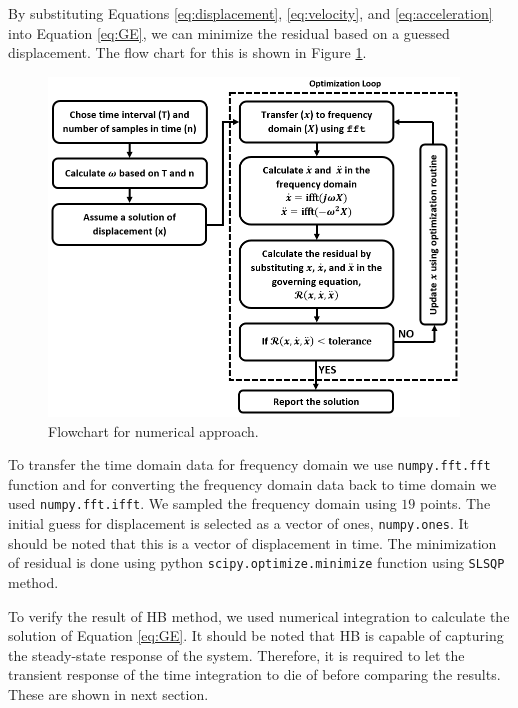 \documentclass[12pt, a4paper]{extarticle}
\begin{document}
By substituting Equations \eqref{eq:displacement}, \eqref{eq:velocity}, and \eqref{eq:acceleration} into Equation \eqref{eq:GE}, we can minimize the residual based on a guessed displacement. The flow chart for this is shown in Figure \ref{fig:flowchart}.
%
\begin{figure}[h]
	\centering
	\includegraphics[height=9.00cm]{figure/minimize_residual.png}
	\caption{Flowchart for numerical approach.}
	\label{fig:flowchart}
\end{figure}
%

To transfer the time domain data for frequency domain we use \texttt{numpy.fft.fft} function and for converting the frequency domain data back to time domain we used \texttt{numpy.fft.ifft}. We sampled the frequency domain using $19$ points. The initial guess for displacement is selected as a vector of ones, \texttt{numpy.ones}. It should be noted that this is a vector of displacement in time. The minimization of residual is done using python \texttt{scipy.optimize.minimize} function using \texttt{SLSQP} method.

To verify the result of HB method, we used numerical integration to calculate the solution of Equation \eqref{eq:GE}. It should be noted that HB is capable of capturing the steady-state response of the system. Therefore, it is required to let the transient response of the time integration to die of before comparing the results. These are shown in next section.
\end{document}
